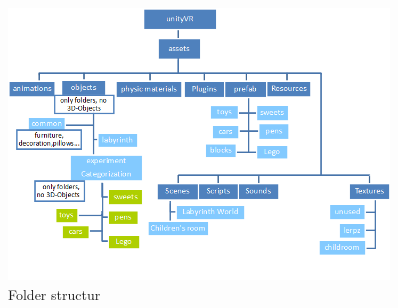 \documentclass[10pt,final]{scrreprt}
\begin{document}

\begin{figure}[h]
\begin{center}
\includegraphics[width=0.9\textwidth]{images/ordnerstruktur.png}
\end{center}
\caption{Folder structur}
\label{folderstructure}
\end{figure}
\end{document}
